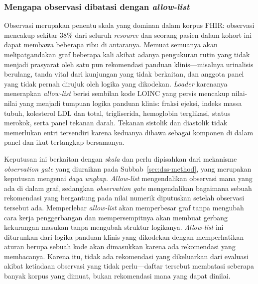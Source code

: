 \subsubsection*{Mengapa observasi dibatasi dengan \emph{allow-list}}
Observasi merupakan penentu skala yang dominan dalam korpus FHIR: observasi mencakup sekitar
38\% dari seluruh \emph{resource} dan seorang pasien dalam kohort ini dapat
membawa beberapa ribu di antaranya. Memuat semuanya akan melipatgandakan graf beberapa kali
akibat adanya pengukuran rutin yang tidak menjadi prasyarat oleh satu pun rekomendasi
panduan klinis---misalnya urinalisis berulang, tanda vital dari kunjungan yang tidak berkaitan, dan
anggota panel yang tidak pernah dirujuk oleh logika yang dikodekan. \emph{Loader} karenanya
menerapkan \emph{allow-list} berisi sembilan kode LOINC yang persis mencakup nilai-nilai
yang menjadi tumpuan logika panduan klinis: fraksi ejeksi, indeks massa tubuh, kolesterol LDL dan
total, trigliserida, hemoglobin terglikasi, status merokok, serta panel tekanan darah. Tekanan
sistolik dan diastolik tidak memerlukan entri tersendiri karena keduanya dibawa sebagai
komponen di dalam panel dan ikut tertangkap bersamanya.

Keputusan ini berkaitan dengan \emph{skala} dan perlu dipisahkan dari mekanisme
\emph{observation gate} yang diuraikan pada Subbab~\ref{sec:dss-method}, yang merupakan
keputusan mengenai \emph{daya ungkap}. \emph{Allow-list} mengendalikan observasi mana yang ada di
dalam graf, sedangkan \emph{observation gate} mengendalikan bagaimana sebuah rekomendasi
yang bergantung pada nilai numerik diputuskan setelah observasi tersebut ada. Memperlebar
\emph{allow-list} akan memperbesar graf tanpa mengubah cara kerja penggerbangan dan mempersempitnya
akan membuat gerbang kekurangan masukan tanpa mengubah struktur logikanya.
\emph{Allow-list} ini diturunkan dari logika panduan klinis yang dikodekan dengan memperhatikan
aturan berupa sebuah kode akan dimasukkan karena ada rekomendasi yang membacanya. Karena itu, tidak ada rekomendasi yang dikeluarkan dari evaluasi akibat ketiadaan observasi yang tidak perlu---daftar
tersebut membatasi seberapa banyak korpus yang dimuat, bukan rekomendasi mana yang dapat
dinilai.

